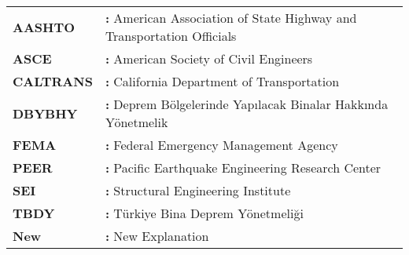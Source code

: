 \hspace{-3mm} %
\begin{tabular}{p{2cm}l}
\textbf{AASHTO} & \textbf{:} American Association of State Highway and Transportation
Officials \tabularnewline
\textbf{ASCE} & \textbf{:} American Society of Civil Engineers \tabularnewline
\textbf{CALTRANS}  & \textbf{:} California Department of Transportation \tabularnewline
\textbf{DBYBHY} & \textbf{:} Deprem Bölgelerinde Yapılacak Binalar Hakkında Yönetmelik \tabularnewline
\textbf{FEMA}  & \textbf{:} Federal Emergency Management Agency \tabularnewline
\textbf{PEER}  & \textbf{:} Pacific Earthquake Engineering Research Center \tabularnewline
\textbf{SEI} & \textbf{:} Structural Engineering Institute \tabularnewline
\textbf{TBDY}  & \textbf{:} Türkiye Bina Deprem Yönetmeliği \tabularnewline
\textbf{New} & \textbf{:} New Explanation\tabularnewline
\end{tabular}
